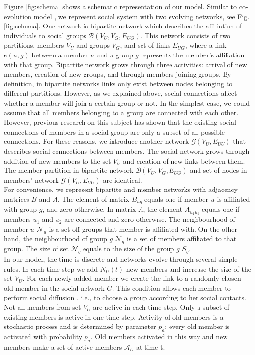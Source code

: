 Figure \ref{fig:schema} shows a schematic representation of our model. Similar to co-evolution model \cite{zheleva2009co}, we represent social system with two evolving networks, see Fig. \ref{fig:schema}. One network is bipartite network which describes the affiliation of individuals to social groups $\mathcal{B}(V_{U}, V_{G}, E_{UG})$. This network consists of two partitions, members $V_{U}$ and groups $V_{G}$, and set of links $E_{UG}$, where a link $e(u,g)$ between a member $u$ and a group $g$ represents the member's affiliation with that group. Bipartite network grows through three activities: arrival of new members, creation of new groups, and through members joining groups. By definition, in bipartite networks links only exist between nodes belonging to different partitions. However, as we explained above, social connections affect whether a member will join a certain group or not. In the simplest case, we could assume that all members belonging to a group are connected with each other. However, previous research on this subject \cite{ smiljanic2017associative, backstrom2006group, zheleva2009co} has shown that the existing social connections of members in a social group are only a subset of all possible connections. For these reasons, we introduce another network $\mathcal{G}(V_{U},E_{UU})$ that describes social connections between members. The social network grows through addition of new members to the set $V_{U}$ and creation of new links between them. The member partition in bipartite network $\mathcal{B}(V_{U}, V_{G}, E_{UG})$ and set of nodes in members' network $\mathcal{G}(V_{U}, E_{UU})$ are identical.\\

For convenience, we represent bipartite and member networks with adjacency matrices $B$ and $A$. The element of matrix $B_{ug}$ equals one if member $u$ is affiliated with group $g$, and zero otherwise. In matrix $A$, the element $A_{u_{1}u_{2}}$ equals one if members $u_{1}$ and $u_{2}$ are connected and zero otherwise. The neighbourhood of member $u$ $\mathcal{N}_{u}$ is a set off groups that member is affiliated with. On the other hand, the neighbourhood of group $g$ $\mathcal{N}_{g}$ is a set of members affiliated to that group. The size of set $\mathcal{N}_g$ equals to the size of the group $g$ $S_{g}$.\\

In our model, the time is discrete and networks evolve through several simple rules. In each time step we add $N_{U}(t)$ new members and increase the size of the set $V_{U}$. For each newly added member we create the link to a randomly chosen old member in the social network $G$. This condition allows each member to perform social diffusion \cite{kairam2012life}, i.e., to choose a group according to her social contacts. 
Not all members from set $V_{U}$ are active in each time step. Only a subset of existing members is active in one time step. Activity of old members is a stochastic process and is determined by parameter $p_{a}$; every old member is activated with probability $p_{a}$. Old members activated in this way and new members make a set of active members $\mathcal{A}_{U}$ at time t.\\ 


